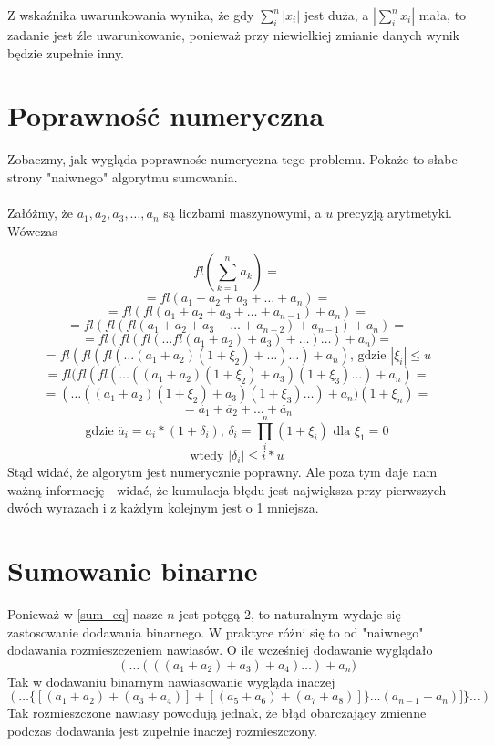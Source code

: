 \documentclass[11pt, wide]{article}
\begin{document}
    Z wskaźnika uwarunkowania wynika, że gdy $\sum_i^{n}|x_i|$ jest duża, a $|\sum_i^{n}x_i|$ mała, to zadanie jest źle
    uwarunkowanie, ponieważ przy niewielkiej zmianie danych wynik będzie zupełnie inny. 
    \section{Poprawność numeryczna}
    Zobaczmy, jak wygląda poprawnośc numeryczna tego problemu. Pokaże to słabe strony "naiwnego" algorytmu sumowania.
    \\\\
    Załóżmy, że $a_1, a_2, a_3, \ldots, a_n$ są liczbami maszynowymi, a $u$ precyzją arytmetyki. Wówczas
    
$$
        fl(\sum_{k=1}^{n}a_k) = 
$$
$$
        = fl(a_1 + a_2 + a_3 + \ldots + a_n) =
$$
$$
        = fl(fl(a_1 + a_2 + a_3 + \ldots + a_{n-1}) + a_n) =
$$    
$$
        = fl(fl(fl(a_1 + a_2 + a_3 + \ldots + a_{n-2})+a_{n-1}) + a_n) =
$$
$$
        = fl(fl(fl( \ldots fl(a_1 + a_2) + a_3)+ \ldots) \ldots ) + a_n) =
$$
$$
        = fl(fl(fl(\ldots (a_1 + a_2)(1 + \xi_2) + \ldots)\ldots)+a_n) \text{, gdzie } |\xi_i| \leq u 
$$
$$
        = fl(fl(fl(\ldots ((a_1 + a_2)(1 + \xi_2) + a_3)(1 + \xi_3)\ldots) + a_n) = 
$$
$$
        = (\ldots((a_1 + a_2)(1 + \xi_2) + a_3)(1 + \xi_3)\ldots) + a_n)(1 + \xi_{n}) = 
$$
$$
        = \ddot{a_1} + \ddot{a_2} + \ldots + \ddot{a_n} 
$$
$$
        \text{gdzie } \ddot{a_i} = a_i * (1 + \delta_i) \text{, } \delta_i = \prod_{i}^{n}(1 + \xi_i) \text{ dla } \xi_1 = 0
$$
$$
        \text{wtedy } |\delta_i| \leq i*u
$$
    Stąd widać, że algorytm jest numerycznie poprawny. Ale poza tym daje nam ważną informację - widać, że 
    kumulacja błędu jest największa przy pierwszych dwóch wyrazach i z każdym kolejnym jest o 1 mniejsza. 
    \section{Sumowanie binarne}
    Ponieważ w \eqref{sum_eq} nasze $n$ jest potęgą 2, to naturalnym wydaje się zastosowanie
    dodawania binarnego. W praktyce różni się to od "naiwnego" dodawania rozmieszczeniem nawiasów. O ile wcześniej dodawanie wyglądało
$$
    ( \ldots (((a_1 + a_2) + a_3) + a_4) \ldots ) + a_n)
$$
    Tak w dodawaniu binarnym nawiasowanie wygląda inaczej
$$
    (\ldots\{[(a_1 + a_2) + (a_3 + a_4)] + [(a_5 + a_6) + (a_7 + a_8)]\} \ldots (a_{n-1} + a_n)]\}\ldots)
$$
    Tak rozmieszczone nawiasy powodują jednak, że błąd obarczający zmienne podczas dodawania jest zupełnie inaczej rozmieszczony. 
\end{document}
